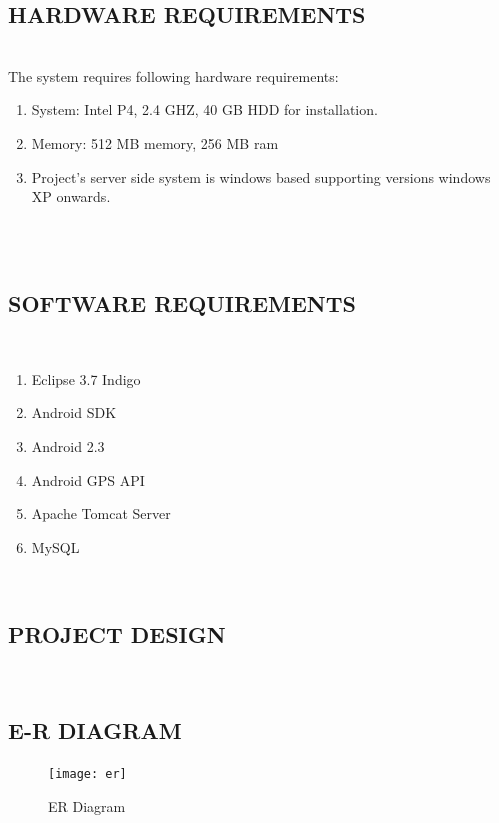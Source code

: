 \documentclass[12pt,a4paper]{article}
\begin{document}
\subsection{HARDWARE REQUIREMENTS}
\\
\hspace{0.7 cm} The system requires following hardware requirements:
\\
\begin{enumerate}
\item System:	Intel P4, 2.4 GHZ, 40 GB HDD for installation. 
\\
\item Memory:	512 MB memory, 256 MB ram 
\\
\item Project’s server side system is windows based supporting versions windows XP onwards.  

\end{enumerate}
\\
\\
\subsection{SOFTWARE REQUIREMENTS}
\\
\begin{enumerate}
\item 	Eclipse 3.7 Indigo
\item Android SDK
\item Android 2.3
\item Android GPS API
\item Apache Tomcat Server
\item MySQL
\end{enumerate}
\\
\newpage
\pagestyle{plain} 
\begin{center}
\section{PROJECT DESIGN}
\end{center}
\hspace{0.7cm}
\\
\subsection{E-R DIAGRAM}
\begin{figure}[!htb]
\centering
\texttt{[image: er]}
\caption{ER Diagram}
\end{figure}
\\
\newpage
\end{document}
